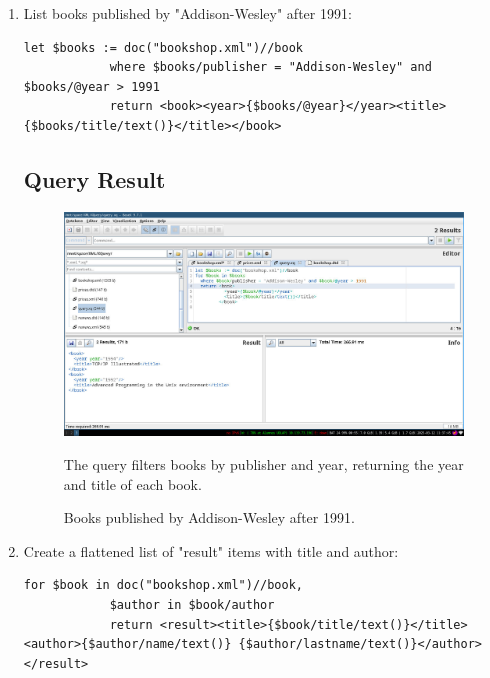 \documentclass[twoside]{article}
\begin{document}
\begin{enumerate}
	\item List books published by "Addison-Wesley" after 1991:
		\begin{lstlisting}[style=xquery]
			let $books := doc("bookshop.xml")//book
			where $books/publisher = "Addison-Wesley" and $books/@year > 1991
			return <book><year>{$books/@year}</year><title>{$books/title/text()}</title></book>
		\end{lstlisting}
		\subsection*{Query Result}
		\begin{figure}[H]
			\centering
			\includegraphics[width=1\textwidth]{imgs/x1.jpeg}
			\caption{Books published by Addison-Wesley after 1991.}
			\label{fig:1}
			\small{The query filters books by publisher and year, returning the year and title of each book.}
		\end{figure}
	\item Create a flattened list of "result" items with title and author:
		\begin{lstlisting}[style=xquery]
			for $book in doc("bookshop.xml")//book,
			$author in $book/author
			return <result><title>{$book/title/text()}</title><author>{$author/name/text()} {$author/lastname/text()}</author></result>
		\end{lstlisting}

\end{enumerate}
\end{document}
